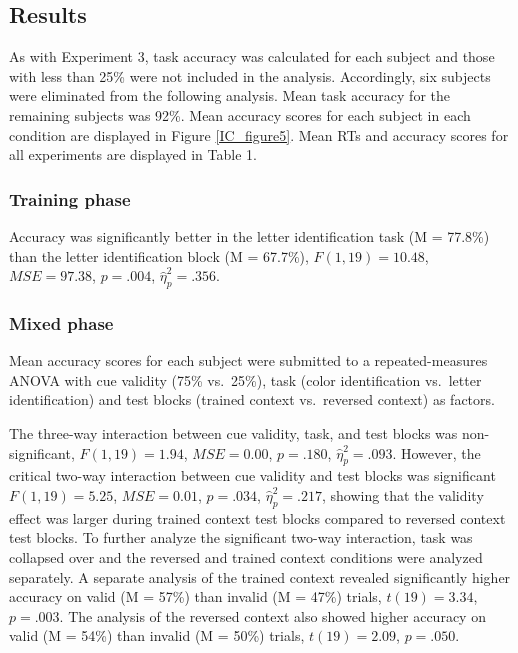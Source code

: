 \documentclass[]{DissertateCUNY}
\begin{document}
\hypertarget{results-3}{%
\subsection{Results}\label{results-3}}

As with Experiment 3, task accuracy was calculated for each subject and
those with less than 25\% were not included in the analysis.
Accordingly, six subjects were eliminated from the following analysis.
Mean task accuracy for the remaining subjects was 92\%. Mean accuracy
scores for each subject in each condition are displayed in Figure
\ref{IC_figure5}. Mean RTs and accuracy scores for all experiments are
displayed in Table 1.

\hypertarget{training-phase-1}{%
\subsubsection{Training phase}\label{training-phase-1}}

Accuracy was significantly better in the letter identification task (M =
77.8\%) than the letter identification block (M = 67.7\%),
\(F(1, 19) = 10.48\), \(\mathit{MSE} = 97.38\), \(p = .004\),
\(\hat{\eta}^2_p = .356\).

\hypertarget{mixed-phase-1}{%
\subsubsection{Mixed phase}\label{mixed-phase-1}}

Mean accuracy scores for each subject were submitted to a
repeated-measures ANOVA with cue validity (75\% vs.~25\%), task (color
identification vs.~letter identification) and test blocks (trained
context vs.~reversed context) as factors.

The three-way interaction between cue validity, task, and test blocks
was non-significant, \(F(1, 19) = 1.94\), \(\mathit{MSE} = 0.00\),
\(p = .180\), \(\hat{\eta}^2_p = .093\). However, the critical two-way
interaction between cue validity and test blocks was significant
\(F(1, 19) = 5.25\), \(\mathit{MSE} = 0.01\), \(p = .034\),
\(\hat{\eta}^2_p = .217\), showing that the validity effect was larger
during trained context test blocks compared to reversed context test
blocks. To further analyze the significant two-way interaction, task was
collapsed over and the reversed and trained context conditions were
analyzed separately. A separate analysis of the trained context revealed
significantly higher accuracy on valid (M = 57\%) than invalid (M =
47\%) trials, \(t(19) = 3.34\), \(p = .003\). The analysis of the
reversed context also showed higher accuracy on valid (M = 54\%) than
invalid (M = 50\%) trials, \(t(19) = 2.09\), \(p = .050\).
\end{document}
